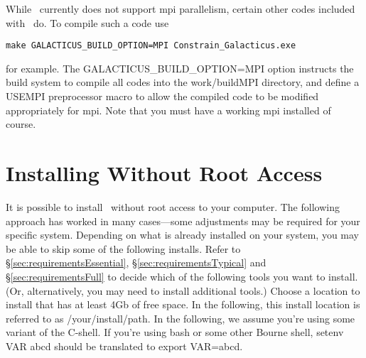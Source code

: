 While \glc\ currently does not support \gls{mpi} parallelism, certain other codes included with \glc\ do. To compile such a code use
\begin{verbatim}
make GALACTICUS_BUILD_OPTION=MPI Constrain_Galacticus.exe
\end{verbatim}
for example. The {\normalfont \ttfamily GALACTICUS\_BUILD\_OPTION=MPI} option instructs the build system to compile all codes into the {\normalfont \ttfamily work/buildMPI} directory, and define a {\normalfont \ttfamily USEMPI} preprocessor macro to allow the compiled code to be modified appropriately for \gls{mpi}. Note that you must have a working \gls{mpi} installed of course.

\section{Installing Without Root Access}

It is possible to install \glc\ without root access to your computer. The following approach has worked in many cases---some adjustments may be required for your specific system. Depending on what is already installed on your system, you may be able to skip some of the following installs. Refer to \S\ref{sec:requirementsEssential}, \S\ref{sec:requirementsTypical} and \S\ref{sec:requirementsFull} to decide which of the following tools you want to install. (Or, alternatively, you may need to install additional tools.) Choose a location to install that has at least 4Gb of free space. In the following, this install location is referred to as {\normalfont \ttfamily /your/install/path}. In the following, we assume you're using some variant of the C-shell. If you're using {\normalfont \ttfamily bash} or some other Bourne shell, {\normalfont \ttfamily setenv VAR abcd} should be translated to {\normalfont \ttfamily export VAR=abcd}.

